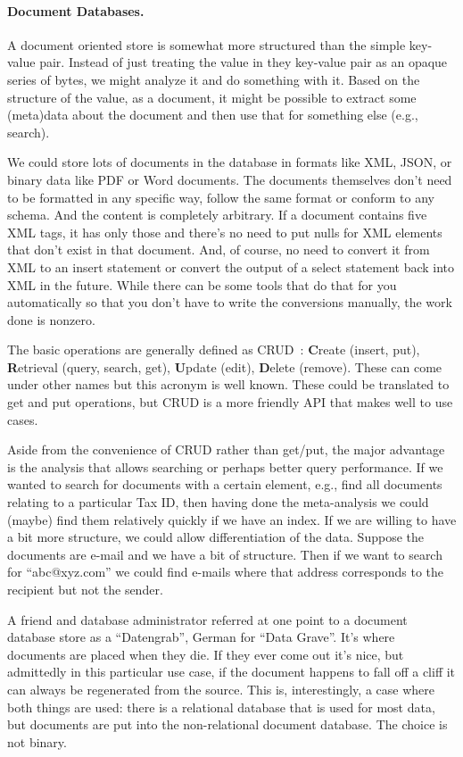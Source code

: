 \paragraph{Document Databases.} 

A document oriented store is somewhat more structured than the simple key-value pair. Instead of just treating the value in they key-value pair as an opaque series of bytes, we might analyze it and do something with it. Based on the structure of the value, as a document, it might be possible to extract some (meta)data about the document and then use that for something else (e.g., search). 

We could store lots of documents in the database in formats like XML, JSON, or binary data like PDF or Word documents. The documents themselves don't need to be formatted in any specific way, follow the same format or conform to any schema. And the content is completely arbitrary. If a document contains five XML tags, it has only those and there's no need to put nulls for XML elements that don't exist in that document. And, of course, no need to convert it from XML to an insert statement or convert the output of a select statement back into XML in the future. While there can be some tools that do that for you automatically so that you don't have to write the conversions manually, the work done is nonzero.

The basic operations are generally defined as CRUD~\cite{martin1983managing}: \textbf{C}reate (insert, put), \textbf{R}etrieval (query, search, get), \textbf{U}pdate (edit), \textbf{D}elete (remove). These can come under other names but this acronym is well known. These could be translated to get and put operations, but CRUD is a more friendly API that makes well to use cases.

Aside from the convenience of CRUD rather than get/put, the major advantage is the analysis that allows searching or perhaps better query performance. If we wanted to search for documents with a certain element, e.g., find all documents relating to a particular Tax ID, then having done the meta-analysis we could (maybe) find them relatively quickly if we have an index. If we are willing to have a bit more structure, we could allow differentiation of the data. Suppose the documents are e-mail and we have a bit of structure. Then if we want to search for ``abc@xyz.com'' we could find e-mails where that address corresponds to the recipient but not the sender.

A friend and database administrator referred at one point to a document database store as a ``Datengrab'', German for ``Data Grave''. It's where documents are placed when they die. If they ever come out it's nice, but admittedly in this particular use case, if the document happens to fall off a cliff it can always be regenerated from the source. This is, interestingly, a case where both things are used: there is a relational database that is used for most data, but documents are put into the non-relational document database. The choice is not binary.

